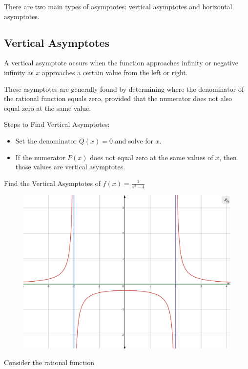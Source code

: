 There are two main types of asymptotes: vertical asymptotes and horizontal asymptotes.


\subsection*{Vertical Asymptotes}

A vertical asymptote occurs when the function approaches infinity or negative infinity as \( x \) approaches a certain value from the left or right.

These asymptotes are generally found by determining where the denominator of the rational function equals zero, provided that the numerator does not also equal zero at the same value.

Steps to Find Vertical Asymptotes:
\begin{itemize}
\item Set the denominator \( Q(x) = 0 \) and solve for \( x \).
\item If the numerator \( P(x) \) does not equal zero at the same values of \( x \), then those values are vertical asymptotes.
\end{itemize}

\begin{example}
Find the Vertical Asymptotes of \( f(x) = \frac{1}{x^2 - 4} \)

\begin{figure}[H]
  \centering
  \includegraphics[scale=0.2]{"./fig/vert_asym.png"}
\end{figure}
\end{example}

Consider the rational function

